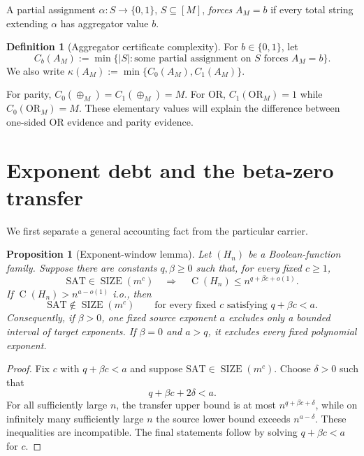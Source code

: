 \documentclass[11pt]{article}
\newtheorem{proposition}[theorem]{Proposition}
\theoremstyle{definition}
\newtheorem{definition}[theorem]{Definition}
\newcommand{\bits}{\{0,1\}}
\newcommand{\SIZE}{\operatorname{SIZE}}
\newcommand{\Ckt}{\operatorname{C}}
\newcommand{\SAT}{\mathrm{SAT}}
\begin{document}
A partial assignment $\alpha:S\to\bits$, $S\subseteq[M]$, \emph{forces} $A_M=b$ if every total string extending $\alpha$ has aggregator value $b$.

\begin{definition}[Aggregator certificate complexity]\label{def:cert-complexity}
For $b\in\bits$, let
\[
  C_b(A_M)
  :=\min\bigl\{|S|:\text{some partial assignment on }S\text{ forces }A_M=b\bigr\}.
\]
We also write $\kappa(A_M):=\min\{C_0(A_M),C_1(A_M)\}$.
\end{definition}

For parity, $C_0(\oplus_M)=C_1(\oplus_M)=M$. For OR, $C_1(\mathrm{OR}_M)=1$ while $C_0(\mathrm{OR}_M)=M$. These elementary values will explain the difference between one-sided OR evidence and parity evidence.

\section{Exponent debt and the beta-zero transfer}\label{sec:exponent}

We first separate a general accounting fact from the particular carrier.

\begin{proposition}[Exponent-window lemma]\label{prop:exponent-window}
Let $(H_n)$ be a Boolean-function family. Suppose there are constants $q,\beta\ge 0$ such that, for every fixed $c\ge 1$,
\begin{equation}\label{eq:general-transfer}
  \SAT\in\SIZE(m^c)
  \quad\Longrightarrow\quad
  \Ckt(H_n)\le n^{q+\beta c+o(1)}.
\end{equation}
If $\Ckt(H_n)>n^{a-o(1)}$ i.o., then
\[
  \SAT\notin\SIZE(m^c)
  \qquad\text{for every fixed }c\text{ satisfying }q+\beta c<a.
\]
Consequently, if $\beta>0$, one fixed source exponent $a$ excludes only a bounded interval of target exponents. If $\beta=0$ and $a>q$, it excludes every fixed polynomial exponent.
\end{proposition}

\begin{proof}
Fix $c$ with $q+\beta c<a$ and suppose $\SAT\in\SIZE(m^c)$. Choose $\delta>0$ such that
\[
  q+\beta c+2\delta<a.
\]
For all sufficiently large $n$, the transfer upper bound is at most $n^{q+\beta c+\delta}$, while on infinitely many sufficiently large $n$ the source lower bound exceeds $n^{a-\delta}$. These inequalities are incompatible. The final statements follow by solving $q+\beta c<a$ for $c$.
\end{proof}
\end{document}
